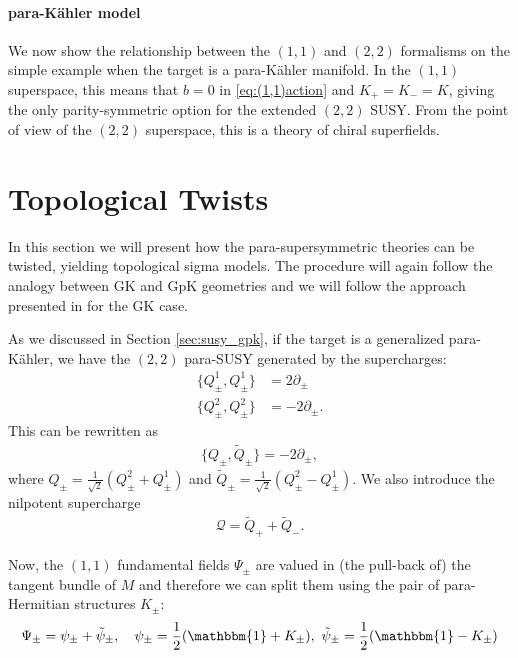 \documentclass{article}
\newcommand{\QQ}{\mathcal{Q}}
\newcommand{\id}{\mathbbm{1}}
\newcommand{\p}{\partial}
\newcommand{\tth}{\tl{\theta}}
\def\tl{\tilde}
\theoremstyle{definition}
\theoremstyle{definition}
\theoremstyle{remark}
\begin{document}


\paragraph{para-K\"ahler model}
We now show the relationship between the $(1,1)$ and $(2,2)$ formalisms on the simple example when the target is a para-K\"ahler manifold. In the $(1,1)$ superspace, this means that $b=0$ in \eqref{eq:(1,1)action} and $K_+=K_-=K$, giving the only parity-symmetric option for the extended $(2,2)$ SUSY. From the point of view of the $(2,2)$ superspace, this is a theory of chiral superfields.


\section{Topological Twists}
In this section we will present how the para-supersymmetric theories can be twisted, yielding topological sigma models. The procedure will again follow the analogy between GK and GpK geometries and we will follow the approach presented in \cite{Kapustin:2004gv} for the GK case.

As we discussed in Section \ref{sec:susy_gpk}, if the target is a generalized para-K\"ahler, we have the $(2,2)$ para-SUSY generated by the supercharges:
\begin{align*}
\{Q_\pm^1,Q_\pm^1\}&=2\p_\pm\\
\{Q_\pm^2,Q_\pm^2\}&=-2\p_\pm.
\end{align*}
This can be rewritten as
\begin{align*}
\{Q_\pm,\tl{Q}_\pm\}=-2\p_\pm,
\end{align*}
where $Q_\pm=\frac{1}{\sqrt{2}}(Q^2_\pm+Q^1_\pm)$ and $\tl{Q}_\pm=\frac{1}{\sqrt{2}}(Q^2_\pm-Q^1_\pm)$. We also introduce the nilpotent supercharge
\begin{align*}
\QQ=\tl{Q}_++\tl{Q}_-.
\end{align*}

Now, the $(1,1)$ fundamental fields $\Psi_\pm$ are valued in (the pull-back of) the tangent bundle of $M$ and therefore we can split them using the pair of para-Hermitian structures $K_\pm$:
\begin{align*}
\Psi_\pm=\psi_\pm+\tl{\psi}_\pm,\quad \psi_\pm=\frac{1}{2}(\id+K_\pm),\ \tl{\psi}_\pm=\frac{1}{2}(\id-K_\pm)
\end{align*}
\end{document}
